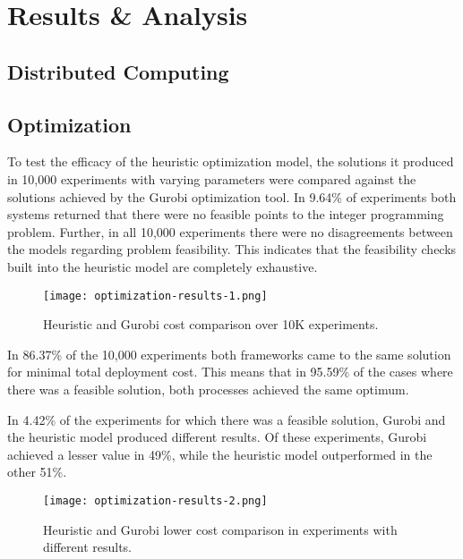 \documentclass[../mthe-493-final-project.tex]{subfiles}
\begin{document}
    \chapter{Results \& Analysis}
    \label{ch:results-and-analysis}
    \section{Distributed Computing}
    
    \section{Optimization}
    
    To test the efficacy of the heuristic optimization model, the solutions it produced in 10,000 experiments with varying parameters were compared against the solutions achieved by the Gurobi optimization tool. In 9.64\% of experiments both systems returned that there were no feasible points to the integer programming problem. Further, in all 10,000 experiments there were no disagreements between the models regarding problem feasibility. This indicates that the feasibility checks built into the heuristic model are completely exhaustive.
    
    
    \begin{figure}
        \centering
        \texttt{[image: optimization-results-1.png]}
        \caption{Heuristic and Gurobi cost comparison over 10K experiments.}
        \label{fig:optimization-results-1}
    \end{figure}
    
    In 86.37\% of the 10,000 experiments both frameworks came to the same solution for minimal total deployment cost. This means that in 95.59\% of the cases where there was a feasible solution, both processes achieved the same optimum.
    
    In 4.42\% of the experiments for which there was a feasible solution, Gurobi and the heuristic model produced different results. Of these experiments, Gurobi achieved a lesser value in 49\%, while the heuristic model outperformed in the other 51\%.
    
    \begin{figure}
        \centering
        \texttt{[image: optimization-results-2.png]}
        \caption{Heuristic and Gurobi lower cost comparison in experiments with different results.}
        \label{fig:optimization-results-2}
    \end{figure}
    
\end{document}
